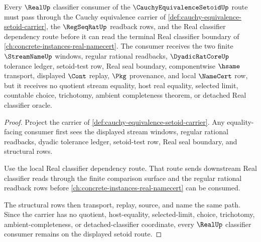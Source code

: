 \begin{theorem}
\label{thm:cauchy-equivalence-setoid-real-classifier-consumer}
Every $\RealUp$ classifier consumer of the $\CauchyEquivalenceSetoidUp$ route must pass through the Cauchy equivalence carrier of \autoref{def:cauchy-equivalence-setoid-carrier}, the $\RegSeqRatUp$ readback rows, and the Real classifier dependency route before it can read the terminal Real classifier boundary of \autoref{ch:concrete-instances-real-namecert}. The consumer receives the two finite $\StreamNameUp$ windows, regular rational readbacks, $\DyadicRatCoreUp$ tolerance ledger, setoid-test row, Real seal boundary, componentwise $\hsame$ transport, displayed $\Cont$ replay, $\Pkg$ provenance, and local $\NameCert$ row, but it receives no quotient stream equality, host real equality, selected limit, countable choice, trichotomy, ambient completeness theorem, or detached Real classifier oracle.
\end{theorem}
\begin{proof}
Project the carrier of \autoref{def:cauchy-equivalence-setoid-carrier}. Any equality-facing consumer first sees the displayed stream windows, regular rational readbacks, dyadic tolerance ledger, setoid-test row, Real seal boundary, and structural rows.

Use the local Real classifier dependency route. That route sends downstream Real classifier reads through the finite comparison surface and the regular rational readback rows before \autoref{ch:concrete-instances-real-namecert} can be consumed.

The structural rows then transport, replay, source, and name the same path. Since the carrier has no quotient, host-equality, selected-limit, choice, trichotomy, ambient-completeness, or detached-classifier coordinate, every $\RealUp$ classifier consumer remains on the displayed setoid route.
\end{proof}

